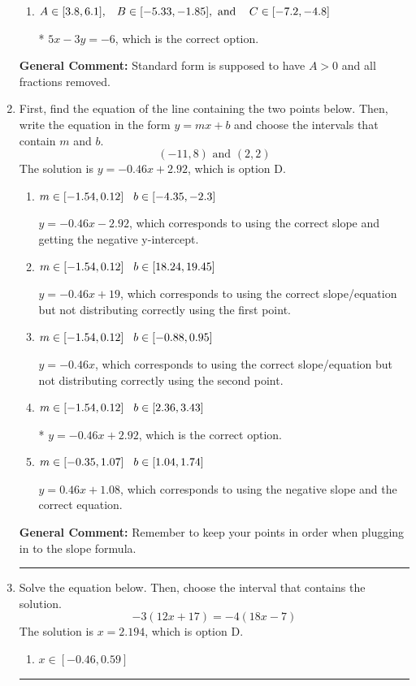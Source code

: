 \documentclass{extbook}[14pt]
\newcommand{\litem}[1]{\item #1

\rule{\textwidth}{0.4pt}}
\begin{document}
\begin{enumerate}
{\begin{enumerate}[label=\Alph*.]
 $-1.667x + 1y = 2.0$, which corresponds to not removing rational values for Standard Form.
\item \( A \in [3.8, 6.1], \hspace{3mm} B \in [-5.33, -1.85], \text{ and } \hspace{3mm} C \in [-7.2, -4.8] \)

* $5x - 3y = -6$, which is the correct option.
\end{enumerate}

\textbf{General Comment:} Standard form is supposed to have $A > 0$ and all fractions removed.
}
\litem{
First, find the equation of the line containing the two points below. Then, write the equation in the form $ y=mx+b $ and choose the intervals that contain $m$ and $b$.
\[ (-11, 8) \text{ and } (2, 2) \]The solution is \( y = -0.46x + 2.92 \), which is option D.\begin{enumerate}[label=\Alph*.]
\item \( m \in [-1.54, 0.12] \hspace*{3mm} b \in [-4.35, -2.3] \)

 $y = -0.46x -2.92$, which corresponds to using the correct slope and getting the negative y-intercept.
\item \( m \in [-1.54, 0.12] \hspace*{3mm} b \in [18.24, 19.45] \)

 $y = -0.46x + 19$, which corresponds to using the correct slope/equation but not distributing correctly using the first point.
\item \( m \in [-1.54, 0.12] \hspace*{3mm} b \in [-0.88, 0.95] \)

 $y = -0.46x$, which corresponds to using the correct slope/equation but not distributing correctly using the second point.
\item \( m \in [-1.54, 0.12] \hspace*{3mm} b \in [2.36, 3.43] \)

* $y = -0.46x + 2.92$, which is the correct option.
\item \( m \in [-0.35, 1.07] \hspace*{3mm} b \in [1.04, 1.74] \)

 $y = 0.46x + 1.08$, which corresponds to using the negative slope and the correct equation.
\end{enumerate}

\textbf{General Comment:} Remember to keep your points in order when plugging in to the slope formula.
}
\litem{
Solve the equation below. Then, choose the interval that contains the solution.
\[ -3(12x + 17) = -4(18x -7) \]The solution is \( x = 2.194 \), which is option D.\begin{enumerate}[label=\Alph*.]
\item \( x \in [-0.46, 0.59] \)


\end{enumerate}}
\end{enumerate}
\end{document}
